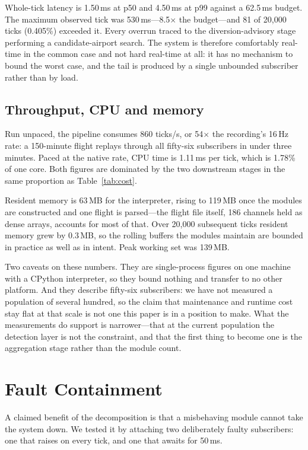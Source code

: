 \documentclass[conference]{IEEEtran}
\begin{document}
Whole-tick latency is 1.50\,ms at p50 and 4.50\,ms at p99 against a 62.5\,ms
budget. The maximum observed tick was 530\,ms---8.5$\times$ the budget---and
81 of 20{,}000 ticks (0.405\%) exceeded it. Every overrun traced to the
diversion-advisory stage performing a candidate-airport search. The system is
therefore comfortably real-time in the common case and not hard real-time at
all: it has no mechanism to bound the worst case, and the tail is produced by
a single unbounded subscriber rather than by load.

\subsection{Throughput, CPU and memory}

Run unpaced, the pipeline consumes 860 ticks/s, or 54$\times$ the recording's
16\,Hz rate: a 150-minute flight replays through all fifty-six subscribers in
under three minutes. Paced at the native rate, CPU time is 1.11\,ms per tick,
which is 1.78\% of one core. Both figures are dominated by the two downstream
stages in the same proportion as Table~\ref{tab:cost}.

Resident memory is 63\,MB for the interpreter, rising to 119\,MB once the
modules are constructed and one flight is parsed---the flight file itself,
186 channels held as dense arrays, accounts for most of that. Over 20{,}000
subsequent ticks resident memory grew by 0.3\,MB, so the rolling buffers the
modules maintain are bounded in practice as well as in intent. Peak working
set was 139\,MB.

Two caveats on these numbers. They are single-process figures on one machine
with a CPython interpreter, so they bound nothing and transfer to no other
platform. And they describe fifty-six subscribers: we have not measured a
population of several hundred, so the claim that maintenance and runtime cost
stay flat at that scale is not one this paper is in a position to make. What
the measurements do support is narrower---that at the current population the
detection layer is not the constraint, and that the first thing to become one
is the aggregation stage rather than the module count.

\section{Fault Containment}
\label{sec:containment}

A claimed benefit of the decomposition is that a misbehaving module cannot
take the system down. We tested it by attaching two deliberately faulty
subscribers: one that raises on every tick, and one that awaits for 50\,ms.
\end{document}
